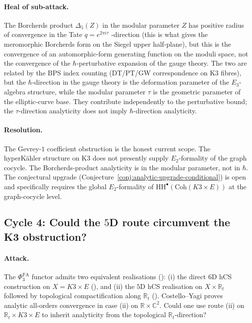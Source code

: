 \documentclass[11pt]{article}
\providecommand{\HH}{\mathrm{HH}}
\providecommand{\C}{\mathbb{C}}
\providecommand{\R}{\mathbb{R}}
\providecommand{\Coh}{\mathrm{Coh}}
\theoremstyle{definition}\newtheorem{definition}[theorem]{Definition}
\theoremstyle{remark}\newtheorem{remark}[theorem]{Remark}\newtheorem{example}[theorem]{Example}
\begin{document}
\paragraph{Heal of sub-attack.}
The Borcherds product $\Delta_5(Z)$ in the modular parameter $Z$ has
positive radius of convergence in the Tate $q = e^{2\pi i\tau}$ -direction
(this is what gives the meromorphic Borcherds form on the Siegel upper
half-plane), but this is the convergence of an automorphic-form
generating function on the moduli space, not the convergence of the
$\hbar$-perturbative expansion of the gauge theory. The two are
related by the BPS index counting (DT/PT/GW correspondence on K3 fibres),
but the $\hbar$-direction in the gauge theory is the deformation
parameter of the $E_3$-algebra structure, while the modular parameter
$\tau$ is the geometric parameter of the elliptic-curve base. They
contribute independently to the perturbative bound; the $\tau$-direction
analyticity does not imply $\hbar$-direction analyticity.

\paragraph{Resolution.}
The Gevrey-$1$ coefficient obstruction is the honest current scope.
The hyperK\"ahler structure on K3 does not presently supply
$E_2$-formality of the graph cocycle. The Borcherds-product analyticity
is in the modular parameter, not in $\hbar$. The conjectural upgrade
(Conjecture~\ref{conj:analytic-upgrade-conditional}) is open and
specifically requires the global $E_2$-formality of
$\HH^\bullet(\Coh(K3\times E))$ at the graph-cocycle level.

\subsection{Cycle 4: Could the $5$D route circumvent the K3 obstruction?}

\paragraph{Attack.}
The $\Phi^{\mathrm{FA}}_3$ functor admits two equivalent realisations
(\cite[remark comparing the $6$d and $5$d realisations]{cy_to_chiral}):
(i) the direct $6$D hCS construction on $X = K3\times E$
(\cite[theorem on the $6$d hCS factorisation algebra on $K3\times E$]{cy_to_chiral}),
and (ii) the $5$D hCS realisation on $X\times \R_t$ followed by
topological compactification along $\R_t$
(\cite[proposition on holomorphic-topological BV factorisation of $5$d hCS observables]{cy_to_chiral}).
Costello--Yagi proves analytic all-orders convergence in case (ii) on
$\R\times\C^2$. Could one use route (ii) on $\R_t\times K3\times E$
to inherit analyticity from the topological $\R_t$-direction?
\end{document}
